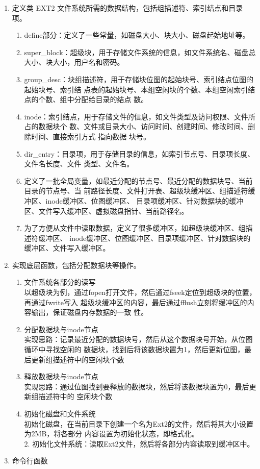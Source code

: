 \documentclass{article}
\begin{document}
    \begin{enumerate}
        \item 定义类 EXT2 文件系统所需的数据结构，包括组描述符、索引结点和目录项。
        \begin{enumerate}
            \item define部分：定义了一些常量，如磁盘大小、块大小、磁盘起始地址等。
            \item super\_block：超级块，用于存储文件系统的信息，如文件系统名、磁盘总大小、块大小，用户名和密码。
            \item group\_desc：块组描述符，用于存储块位图的起始块号、索引结点位图的起始块号、索引结
            点表的起始块号、本组空闲块的个数、本组空闲索引结点的个数、组中分配给目录的结点
            数。
            \item inode：索引结点，用于存储文件的信息，如文件类型及访问权限、文件所占的数据块个
            数、文件或目录大小、访问时间、创建时间、修改时间、删除时间、直接索引方式 指向数据
            块号。
            \item dir\_entry：目录项，用于存储目录的信息，如索引节点号、目录项长度、文件名长度、文件
            类型、文件名。
            \item 定义了一批全局变量，如最近分配的节点号、最近分配的数据块号、当前目录的节点号、当
            前路径长度、文件打开表、超级块缓冲区、组描述符缓冲区、inode缓冲区、位图缓冲区、
            目录项缓冲区、针对数据块的缓冲区、文件写入缓冲区、虚拟磁盘指针、当前路径名。
            \item 为了方便从文件中读取数据，定义了很多缓冲区，如超级块缓冲区、组描述符缓冲区、
            inode缓冲区、位图缓冲区、目录项缓冲区、针对数据块的缓冲区、文件写入缓冲区。
        \end{enumerate}
        \item 实现底层函数，包括分配数据块等操作。
        \begin{enumerate}
            \item 文件系统各部分的读写\\以超级块为例，通过fopen打开文件，然后通过fseek定位到超级块的位置，再通过fwrite写入
            超级块缓冲区的内容，最后通过fflush立刻将缓冲区的内容输出，保证磁盘内存数据的一致
            性。
            \item 分配数据块与inode节点\\实现思路：记录最近分配的数据块号，然后从这个数据块号开始，从位图循环中寻找空闲的
            数据块，找到后将该数据块置为1，然后更新位图，最后更新组描述符中的空闲块个数
            \item 释放数据块与inode节点\\实现思路：通过位图找到要释放的数据块，然后将该数据块置为0，最后更新组描述符中的
            空闲块个数
            \item 初始化磁盘和文件系统\\初始化磁盘，在当前目录下创建一个名为Ext2的文件，然后将其大小设置为2MB，将各部分
            内容设置为初始化状态，即格式化。\\
            2. 初始化文件系统：读取Ext2文件，然后将各部分内容读取到缓冲区中。
        \end{enumerate}
        \item  命令行函数
        

\end{enumerate}
\end{document}
